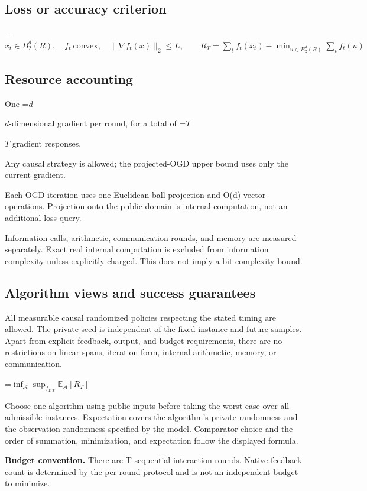 \documentclass[10pt,a4paper]{article}
\newcommand{\AtlasMath}[1]{\par\begingroup\centering\setbox0=\hbox{$\displaystyle #1$}\ifdim\wd0>1.4\linewidth\typeout{ATLAS WIDE FORMULA: \the\wd0}\fi\ifdim\wd0>\linewidth\resizebox{\linewidth}{!}{\box0}\else\box0\fi\par\endgroup}
\newcommand{\AtlasInlineMath}[1]{\begingroup\setbox0=\hbox{$#1$}\ifdim\wd0>.4\linewidth\endgroup\AtlasMath{#1}\else\endgroup$#1$\fi}
\begin{document}
\subsection{Loss or accuracy criterion}

\AtlasMath{x_t\in B_2^d(R),\quad f_t\ \mathrm{convex},\quad \|\nabla f_t(x)\|_2\le L,\qquad R_T=\sum_t f_t(x_t)-\min_{u\in B_2^d(R)}\sum_t f_t(u)}


\subsection{Resource accounting}
One \AtlasInlineMath{d}-dimensional gradient per round, for a total of \AtlasInlineMath{T} gradient responses.

Any causal strategy is allowed; the projected-OGD upper bound uses only the current gradient.

Each OGD iteration uses one Euclidean-ball projection and O(d) vector operations. Projection onto the public domain is internal computation, not an additional loss query.

Information calls, arithmetic, communication rounds, and memory are measured separately. Exact real internal computation is excluded from information complexity unless explicitly charged. This does not imply a bit-complexity bound.

\subsection{Algorithm views and success guarantees}
All measurable causal randomized policies respecting the stated timing are allowed. The private seed is independent of the fixed instance and future samples. Apart from explicit feedback, output, and budget requirements, there are no restrictions on linear spans, iteration form, internal arithmetic, memory, or communication.


\AtlasMath{\inf_{\mathcal{A}}\sup_{f_{1:T}}\mathbb{E}_{\mathcal{A}}[R_T]}


Choose one algorithm using public inputs before taking the worst case over all admissible instances. Expectation covers the algorithm's private randomness and the observation randomness specified by the model. Comparator choice and the order of summation, minimization, and expectation follow the displayed formula.

\textbf{Budget convention.} There are T sequential interaction rounds. Native feedback count is determined by the per-round protocol and is not an independent budget to minimize.
\end{document}
